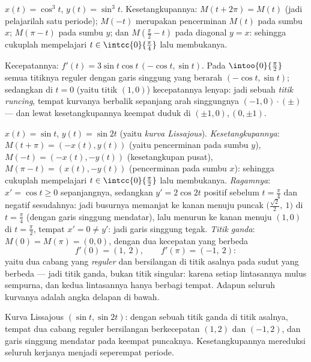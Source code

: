 \begin{example}[Astroid]\label{ex:b1:curves:astroid}
$x(t) = \cos^3 t$, $y(t) = \sin^3 t$. Kesetangkupannya:
$M(t + 2\pi) = M(t)$ (jadi pelajarilah satu periode); $M(-t)$ merupakan pencerminan
$M(t)$ pada sumbu $x$; $M(\pi - t)$ pada sumbu $y$; dan $M(\frac\pi2 -
t)$ pada diagonal $y = x$: sehingga cukuplah mempelajari $t \in
\intcc{0}{\frac\pi4}$ lalu membukanya.

Kecepatannya: $f'(t) = 3\sin t\cos t\,(-\cos t, \sin t)$. Pada
$\intoo{0}{\frac\pi2}$ semua titiknya reguler dengan garis singgung yang berarah
$(-\cos t, \sin t)$; sedangkan di $t = 0$ (yaitu titik $(1,0)$) kecepatannya
lenyap: jadi sebuah \emph{titik runcing}, tempat kurvanya berbalik sepanjang
arah singgungnya $(-1, 0)\cdot(\pm)$ --- dan lewat kesetangkupannya keempat
 duduk di $(\pm1, 0), (0, \pm1)$.
\end{example}

\begin{example}
\label{ex:b1:curves:lissajous}
$x(t) = \sin t$, $y(t) = \sin 2t$ (yaitu \emph{kurva Lissajous}).
\emph{Kesetangkupannya}: $M(t + \pi) = (-x(t), y(t))$ (yaitu pencerminan pada
sumbu $y$), $M(-t) = (-x(t), -y(t))$ (kesetangkupan pusat),
$M(\pi - t) = (x(t), -y(t))$ (pencerminan pada sumbu $x$): sehingga
cukuplah mempelajari $t \in \intcc{0}{\frac\pi2}$ lalu membukanya.
\emph{Ragamnya}: $x' = \cos t \geq 0$ sepanjangnya, sedangkan $y' =
2\cos 2t$ positif sebelum $t = \frac\pi4$ dan negatif sesudahnya:
jadi busurnya memanjat ke kanan menuju puncak
$\bigl(\frac{\sqrt2}2,\ 1\bigr)$ di $t = \frac\pi4$ (dengan garis singgung
mendatar), lalu menurun ke kanan menuju $(1, 0)$ di $t =
\frac\pi2$, tempat $x' = 0 \neq y'$: jadi garis singgung tegak.
\emph{Titik ganda}: $M(0) = M(\pi) = (0,0)$, dengan dua kecepatan
yang berbeda
\[
f'(0) = (1,\ 2), \qquad f'(\pi) = (-1,\ 2) :
\]
yaitu dua cabang yang \emph{reguler} dan bersilangan di titik asalnya pada sudut
yang berbeda --- jadi titik ganda, bukan titik singular: karena setiap lintasannya
mulus sempurna, dan kedua lintasannya hanya berbagi tempat.
Adapun seluruh kurvanya adalah angka delapan di bawah.
\end{example}

\begin{omfigure}

{\small Kurva Lissajous $(\sin t, \sin 2t)$: dengan sebuah titik ganda
di titik asalnya, tempat dua cabang reguler bersilangan berkecepatan
$(1, 2)$ dan $(-1, 2)$, dan garis singgung mendatar pada keempat
puncaknya. Kesetangkupannya mereduksi seluruh kerjanya menjadi seperempat periode.}
\end{omfigure}


